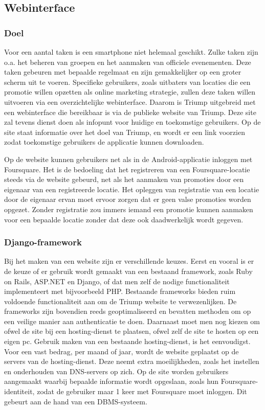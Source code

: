 \subsection{Webinterface}
\label{Webinterface}
\subsubsection{Doel}
Voor een aantal taken is een smartphone niet helemaal geschikt. Zulke taken zijn o.a. het beheren van groepen en het aanmaken van officiele evenementen.
Deze taken gebeuren met bepaalde regelmaat en zijn gemakkelijker op een groter scherm uit te voeren. Specifieke gebruikers, zoals uitbaters van locaties die een promotie willen opzetten als online marketing strategie, zullen deze taken willen uitvoeren via een overzichtelijke webinterface. Daarom is Triump uitgebreid met een webinterface die bereikbaar is via de publieke website van Triump.
Deze site zal tevens dienst doen als infopunt voor huidige en toekomstige gebruikers. Op de site staat informatie over het doel van Triump, en wordt er een link voorzien zodat toekomstige gebruikers de applicatie kunnen downloaden.

Op de website kunnen gebruikers net als in de Android-applicatie inloggen met Foursquare. Het is de bedoeling dat het registreren van een Foursquare-locatie steeds via de website gebeurd, net als het aanmaken van promoties door een eigenaar van een registreerde locatie. Het opleggen van registratie van een locatie door de eigenaar ervan moet ervoor zorgen dat er geen valse promoties worden opgezet. Zonder registratie zou immers iemand een promotie kunnen aanmaken voor een bepaalde locatie zonder dat deze ook daadwerkelijk wordt gegeven.

\subsubsection{Django-framework}
Bij het maken van een website zijn er verschillende keuzes.
Eerst en vooral is er de keuze of er gebruik wordt gemaakt van een bestaand framework, zoals Ruby on Rails, ASP.NET en Django, of dat men zelf de nodige functionaliteit implementeert met bijvoorbeeld PHP.
Bestaande frameworks bieden ruim voldoende functionaliteit aan om de Triump website te verwezenlijken. De frameworks zijn bovendien reeds geoptimaliseerd en bevatten methoden om op een veilige manier aan authenticatie te doen.
Daarnaast moet men nog kiezen om ofwel de site bij een hosting-dienst te plaatsen, ofwel zelf de site te hosten op een eigen pc. Gebruik maken van een bestaande hosting-dienst, is het eenvoudigst. Voor een vast bedrag, per maand of jaar, wordt de website geplaatst op de servers van de hosting-dienst. Deze neemt extra moeilijkheden, zoals het instellen en onderhouden van DNS-servers op zich.
Op de site worden gebruikers aangemaakt waarbij bepaalde informatie wordt opgeslaan, zoals hun Foursquare-identiteit, zodat de gebruiker maar 1 keer met Foursquare moet inloggen. Dit gebeurt aan de hand van een DBMS-systeem. \\

